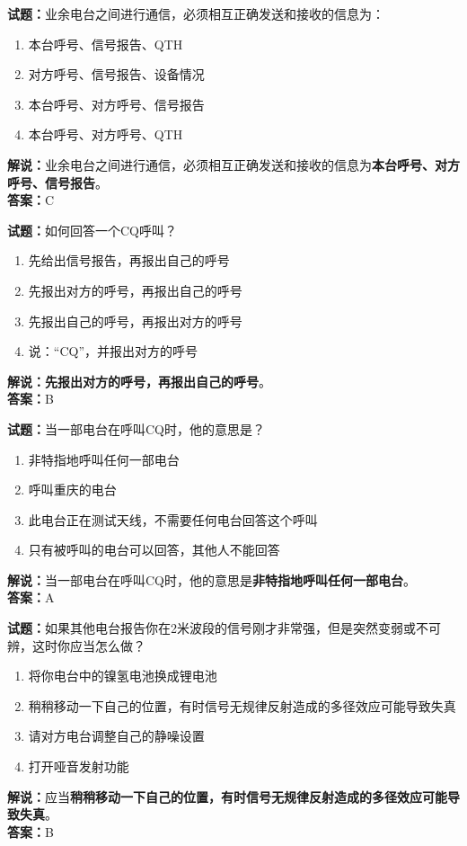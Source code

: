 \documentclass{ctexbook}
\begin{document}
\bigskip

\noindent\textbf{试题：}业余电台之间进行通信，必须相互正确发送和接收的信息为：
\begin{enumerate}[leftmargin=3em]
  \item 本台呼号、信号报告、QTH
  \item 对方呼号、信号报告、设备情况
  \item 本台呼号、对方呼号、信号报告
  \item 本台呼号、对方呼号、QTH
\end{enumerate}
\noindent\textbf{解说：}业余电台之间进行通信，必须相互正确发送和接收的信息为\textbf{本台呼号、对方呼号、信号报告}。\\\noindent\textbf{答案：}C

\bigskip

\noindent\textbf{试题：}如何回答一个CQ呼叫？
\begin{enumerate}[leftmargin=3em]
  \item 先给出信号报告，再报出自己的呼号
  \item 先报出对方的呼号，再报出自己的呼号
  \item 先报出自己的呼号，再报出对方的呼号
  \item 说：“CQ”，并报出对方的呼号
\end{enumerate}
\noindent\textbf{解说：}\textbf{先报出对方的呼号，再报出自己的呼号}。\\\noindent\textbf{答案：}B

\bigskip

\noindent\textbf{试题：}当一部电台在呼叫CQ时，他的意思是？
\begin{enumerate}[leftmargin=3em]
  \item 非特指地呼叫任何一部电台
  \item 呼叫重庆的电台
  \item 此电台正在测试天线，不需要任何电台回答这个呼叫
  \item 只有被呼叫的电台可以回答，其他人不能回答
\end{enumerate}
\noindent\textbf{解说：}当一部电台在呼叫CQ时，他的意思是\textbf{非特指地呼叫任何一部电台}。\\\noindent\textbf{答案：}A

\bigskip

\noindent\textbf{试题：}如果其他电台报告你在2米波段的信号刚才非常强，但是突然变弱或不可辨，这时你应当怎么做？
\begin{enumerate}[leftmargin=3em]
  \item 将你电台中的镍氢电池换成锂电池
  \item 稍稍移动一下自己的位置，有时信号无规律反射造成的多径效应可能导致失真
  \item 请对方电台调整自己的静噪设置
  \item 打开哑音发射功能
\end{enumerate}
\noindent\textbf{解说：}应当\textbf{稍稍移动一下自己的位置，有时信号无规律反射造成的多径效应可能导致失真}。\\\noindent\textbf{答案：}B
\end{document}
